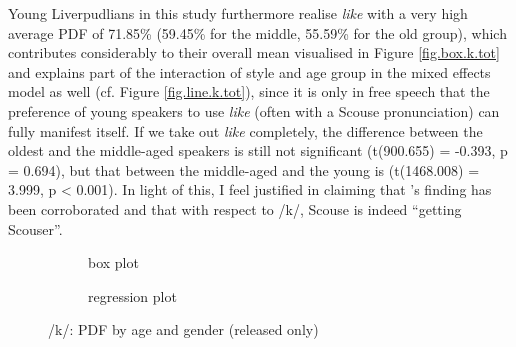 Young Liverpudlians in this study furthermore realise \emph{like} with a very high average PDF of 71.85\% (59.45\% for the middle, 55.59\% for the old group), which contributes considerably to their overall mean visualised in Figure \ref{fig.box.k.tot} and explains part of the interaction of style and age group in the mixed effects model as well (cf. Figure \ref{fig.line.k.tot}), since it is only in free speech that the preference of young speakers to use \emph{like} (often with a Scouse pronunciation) can fully manifest itself.
If we take out \emph{like} completely, the difference between the oldest and the middle-aged speakers is still not significant (t(900.655) = -0.393, p = 0.694), but that between the middle-aged and the young is (t(1468.008) = 3.999, p < 0.001).
In light of this, I feel justified in claiming that \textcite{watson2007a}'s finding has been corroborated and that with respect to /k/, Scouse is indeed ``getting Scouser''.

\begin{figure}[h]
	\centering
	\begin{subfigure}{.49\textwidth}
		\centering
			\resizebox{\linewidth}{!}{} 
		\caption{box plot}
		\label{fig.box.k.agegender}
	\end{subfigure}
	\begin{subfigure}{.49\textwidth}
		\centering
			\resizebox{\linewidth}{!}{}
		\caption{regression plot}
		\label{fig.scatter.k.agegender}
	\end{subfigure}
	\caption{/k/: PDF by age and gender (released only)}
\end{figure}

